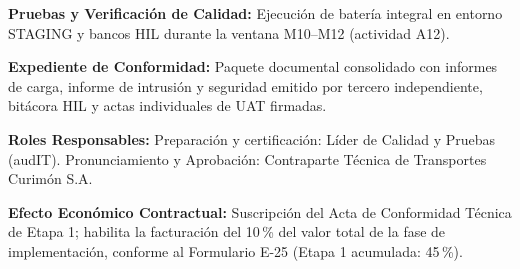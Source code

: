 \par\noindent\textbf{Pruebas y Verificación de Calidad:} Ejecución de batería integral en entorno STAGING y bancos HIL durante la ventana M10--M12 (actividad A12).\par
\par\noindent\textbf{Expediente de Conformidad:} Paquete documental consolidado con informes de carga, informe de intrusión y seguridad emitido por tercero independiente, bitácora HIL y actas individuales de UAT firmadas.\par
\par\noindent\textbf{Roles Responsables:} Preparación y certificación: Líder de Calidad y Pruebas (audIT). Pronunciamiento y Aprobación: Contraparte Técnica de Transportes Curimón S.A.\par
\par\noindent\textbf{Efecto Económico Contractual:} Suscripción del Acta de Conformidad Técnica de Etapa 1; habilita la facturación del 10\,\% del valor total de la fase de implementación, conforme al Formulario E-25 (Etapa 1 acumulada: 45\,\%).\par

